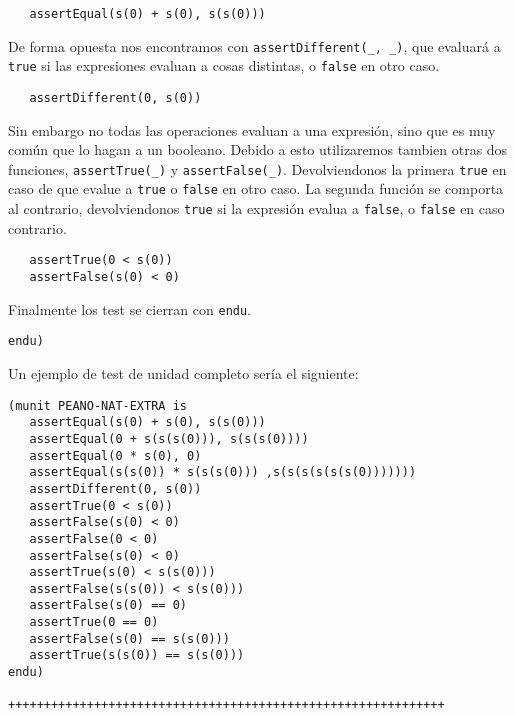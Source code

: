 {\codesize
\begin{verbatim}
   assertEqual(s(0) + s(0), s(s(0)))
\end{verbatim}
}

De forma opuesta nos encontramos con \verb"assertDifferent(_, _)", que evaluará a \texttt{true} si las expresiones evaluan a cosas distintas, o \texttt{false} en otro caso. \par

{\codesize
\begin{verbatim}
   assertDifferent(0, s(0))
\end{verbatim}
}

Sin embargo no todas las operaciones evaluan a una expresión, sino que es muy común que lo hagan a un booleano. Debido a esto utilizaremos tambien otras dos funciones, \verb"assertTrue(_)" y \verb"assertFalse(_)". Devolviendonos la primera \texttt{true} en caso de que evalue a \texttt{true} o \texttt{false} en otro caso. La segunda función se comporta al contrario, devolviendonos \texttt{true} si la expresión evalua a \texttt{false}, o \texttt{false} en caso contrario.\par

{\codesize
\begin{verbatim}
   assertTrue(0 < s(0))
   assertFalse(s(0) < 0)
\end{verbatim}
}

Finalmente los test se cierran con \texttt{endu}. \par

{\codesize
\begin{verbatim}
endu)
\end{verbatim}
}

Un ejemplo de test de unidad completo sería el siguiente: \par

{\codesize
\begin{verbatim}
(munit PEANO-NAT-EXTRA is
   assertEqual(s(0) + s(0), s(s(0)))
   assertEqual(0 + s(s(s(0))), s(s(s(0))))
   assertEqual(0 * s(0), 0)
   assertEqual(s(s(0)) * s(s(s(0))) ,s(s(s(s(s(s(0)))))))
   assertDifferent(0, s(0))
   assertTrue(0 < s(0))
   assertFalse(s(0) < 0)
   assertFalse(0 < 0)
   assertFalse(s(0) < 0)
   assertTrue(s(0) < s(s(0)))
   assertFalse(s(s(0)) < s(s(0)))
   assertFalse(s(0) == 0)
   assertTrue(0 == 0)
   assertFalse(s(0) == s(s(0)))
   assertTrue(s(s(0)) == s(s(0)))
endu)

+++++++++++++++++++++++++++++++++++++++++++++++++++++++++++++
\end{verbatim}
}

